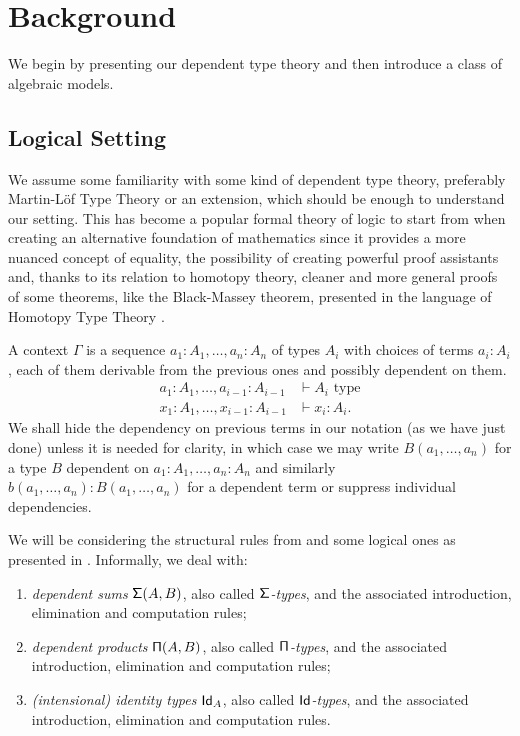 \chapter{Background}\label{chapter1}

We begin by presenting our dependent type theory and then introduce a class of
algebraic models.

\section{Logical Setting}

We assume some familiarity with some kind of dependent type theory, preferably
Martin-L\"{o}f Type Theory \cite{ML84} or an extension, which
should be enough to understand our setting. This has become a popular formal
theory of logic to start from when creating an alternative foundation of
mathematics since it provides a more nuanced concept of equality, the
possibility of creating powerful proof assistants and, thanks to its relation to
homotopy theory, cleaner and more general proofs of some theorems, like the
Black-Massey theorem, presented in the language of Homotopy Type Theory
\cite{Uni13}.

\begin{notation}
  A context $\Gamma$ is a sequence $a_1:A_1,\ldots,a_n:A_n$ of types $A_i$ with
  choices of terms
  $a_i:A_i$, each of them derivable from the previous ones and possibly
  dependent on them.
  \begin{align*}
    a_1:A_1,\ldots,a_{i-1}:A_{i-1} &\vdash A_i \text{ type} \\
    x_1:A_1,\ldots,x_{i-1}:A_{i-1} &\vdash x_i:A_i.
  \end{align*}
  We shall hide the
  dependency on previous terms in our notation (as we have just done) unless
  it is needed for clarity, in which case we
  may write $B(a_1,\ldots,a_n)$ for a type $B$ dependent on
  $a_1:A_1,\ldots,a_n:A_n$ and similarly $b(a_1,\ldots,a_n):B(a_1,\ldots,a_n)$
  for a dependent term or suppress individual dependencies.
\end{notation}

\noindent
We will be considering the structural rules from \cite[App.\ A.1]{KL12} and some
logical ones as presented in \cite[App.\ A.2]{KL12}. Informally, we deal with:
\begin{enumerate}
  \item \emph{dependent sums} $\operatorname{\mathsf{\Sigma}}(A,B)$, also called
    \emph{$\operatorname{\mathsf{\Sigma}}$-types}, and the associated introduction, elimination and
    computation rules;
  \item \emph{dependent products} $\operatorname{\mathsf{\Pi}}(A,B)$, also called \emph{$\operatorname{\mathsf{\Pi}}$-types},
    and the associated introduction, elimination and computation rules;
  \item \emph{(intensional) identity types} $\operatorname{\mathsf{Id}}_A$, also called
    \emph{$\operatorname{\mathsf{Id}}$-types}, and the associated introduction, elimination and
    computation rules.
\end{enumerate}


